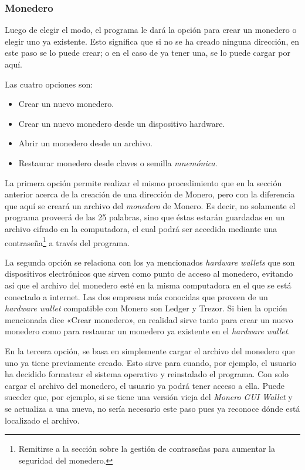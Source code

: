\documentclass[12pt,a4paper,twoside]{book}
\begin{document}
\subsubsection{Monedero}
Luego de elegir el modo, el programa le dará la opción para crear un monedero o elegir uno ya existente. Esto significa que si no se ha creado ninguna dirección, en este paso se lo puede crear; o en el caso de ya tener una, se lo puede cargar por aquí.

Las cuatro opciones son:

\begin{itemize}
\item Crear un nuevo monedero.
\item Crear un nuevo monedero desde un dispositivo hardware.
\item Abrir un monedero desde un archivo.
\item Restaurar monedero desde claves o semilla \textit{mnemónica}.
\end{itemize}

La primera opción permite realizar el mismo procedimiento que en la sección anterior acerca de la creación de una dirección de Monero, pero con la diferencia que aquí se creará un archivo del \textit{monedero} de Monero. Es decir, no solamente el programa proveerá de las 25 palabras, sino que éstas estarán guardadas en un archivo cifrado en la computadora, el cual podrá ser accedida mediante una contraseña\footnote{Remitirse a la sección sobre la gestión de contraseñas para aumentar la seguridad del monedero.} a través del programa.

La segunda opción se relaciona con los ya mencionados \textit{hardware wallets} que son dispositivos electrónicos que sirven como punto de acceso al monedero, evitando así que el archivo del monedero esté en la misma computadora en el que se está conectado a internet. Las dos empresas más conocidas que proveen de un \textit{hardware wallet} compatible con Monero son Ledger y Trezor. Si bien la opción mencionada dice «Crear monedero», en realidad sirve tanto para crear un nuevo monedero como para restaurar un monedero ya existente en el \textit{hardware wallet}.

En la tercera opción, se basa en simplemente cargar el archivo del monedero que uno ya tiene previamente creado. Esto sirve para cuando, por ejemplo, el usuario ha decidido formatear el sistema operativo y reinstalado el programa. Con solo cargar el archivo del monedero, el usuario ya podrá tener acceso a ella. Puede suceder que, por ejemplo, si se tiene una versión vieja del \textit{Monero GUI Wallet} y se actualiza a una nueva, no sería necesario este paso pues ya reconoce dónde está localizado el archivo.
\end{document}
